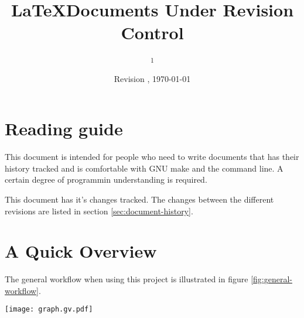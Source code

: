 \documentclass[10pt, a4paper]{article} %
\title{\LaTeX \enspace Documents Under Revision Control}
\author{
 	\authorstyle{Morten Winkler Jørgensen\textsuperscript{1}} %
 	\newline\newline %
 	\textsuperscript{1}\institution{SGRE OF TE}\\ 
 }
\date{ Revision \revision, \today}
\begin{document}
\maketitle %

\thispagestyle{firstpage} %




\section{Reading guide}
This document is intended for people who need to write documents that has their history tracked and is comfortable with GNU make and the command line. A certain degree of programmin understanding is required.

This document has it's changes tracked. The changes between the different revisions are listed in section \ref{sec:document-history}.


\section{A Quick Overview}

The general workflow when using this project is illustrated in figure \ref{fig:general-workflow}.

\begin{figure*}
\centering
	\texttt{[image: graph.gv.pdf]} 
	\caption{General Workflow} 
	\label{fig:general-workflow}
\end{figure*}
\end{document}
